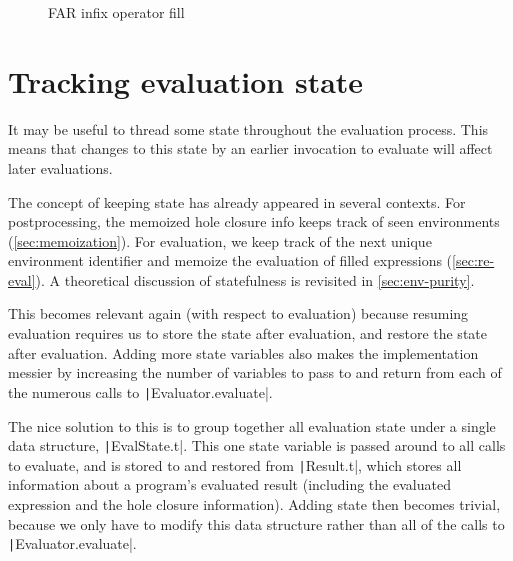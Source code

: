 \begin{figure}
  \centering
  \begin{singlespace}
  \end{singlespace}
  \caption{FAR infix operator fill}
  \label{fig:far-infix-operator-fill}
\end{figure}

\section{Tracking evaluation state}
\label{sec:eval-state}

It may be useful to thread some state throughout the evaluation process. This means that changes to this state by an earlier invocation to evaluate will affect later evaluations.

The concept of keeping state has already appeared in several contexts. For postprocessing, the memoized hole closure info keeps track of seen environments (\cref{sec:memoization}). For evaluation, we keep track of the next unique environment identifier and memoize the evaluation of filled expressions (\cref{sec:re-eval}). A theoretical discussion of statefulness is revisited in \cref{sec:env-purity}.

This becomes relevant again (with respect to evaluation) because resuming evaluation requires us to store the state after evaluation, and restore the state after evaluation. Adding more state variables also makes the implementation messier by increasing the number of variables to pass to and return from each of the numerous calls to \texttt|Evaluator.evaluate|.

The nice solution to this is to group together all evaluation state under a single data structure, \texttt|EvalState.t|. This one state variable is passed around to all calls to evaluate, and is stored to and restored from \texttt|Result.t|, which stores all information about a program's evaluated result (including the evaluated expression and the hole closure information). Adding state then becomes trivial, because we only have to modify this data structure rather than all of the calls to \texttt|Evaluator.evaluate|.

